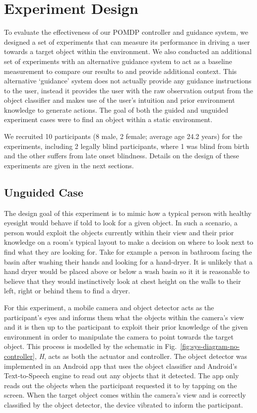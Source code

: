 \documentclass[runningheads]{llncs}
\begin{document}
\section{Experiment Design}\label{sec:experiments}

To evaluate the effectiveness of our POMDP controller and guidance system, we designed a set of experiments that can measure its performance in driving a user towards a target object within the environment. 
We also conducted an additional set of experiments with an alternative guidance system to act as a baseline measurement to compare our results to and provide additional context. 
This alternative `guidance' system does not actually provide any guidance instructions to the user, instead it provides the user with the raw observation output from the object classifier and makes use of the user's intuition and prior environment knowledge to generate actions. 
The goal of both the guided and unguided experiment cases were to find an object within a static environment. 

We recruited 10 participants (8 male, 2 female; average age 24.2 years) for the experiments, including 2 legally blind participants, where 1 was blind from birth and the other suffers from late onset blindness.
Details on the design of these experiments are given in the next sections. 

\subsection{Unguided Case}

The design goal of this experiment is to mimic how a typical person with healthy eyesight would behave if told to look for a given object. 
In such a scenario, a person would exploit the objects currently within their view and their prior knowledge on a room's typical layout to make a decision on where to look next to find what they are looking for. 
Take for example a person in bathroom facing the basin after washing their hands and looking for a hand-dryer. 
It is unlikely that a hand dryer would be placed above or below a wash basin so it it is reasonable to believe that they would instinctively look at chest height on the walls to their left, right or behind them to find a dryer. 

For this experiment, a mobile camera and object detector acts as the participant's eyes and informs them what the objects within the camera's view and it is then up to the participant to exploit their prior knowledge of the given environment in order to manipulate the camera to point towards the target object. 
This process is modelled by the schematic in Fig.~\ref{fig:sys-diagram-no-controller}, \emph{H}, acts as both the actuator and controller.
The object detector was implemented in an Android app that uses the object classifier and Android's Text-to-Speech engine to read out any objects that it detected. 
The app only reads out the objects when the participant requested it to by tapping on the screen. 
When the target object comes within the camera's view and is correctly classified by the object detector, the device vibrated to inform the participant. 
\end{document}
